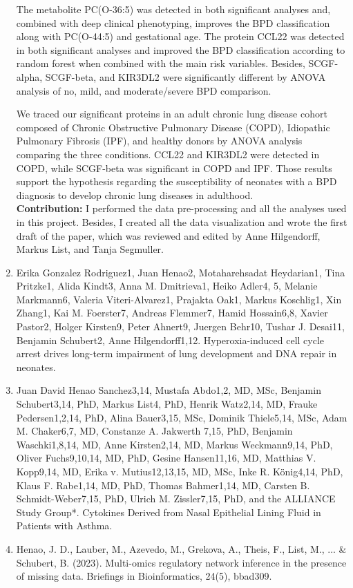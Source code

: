 \begin{enumerate}
The metabolite PC(O-36:5) was detected in both significant analyses and, combined with deep clinical phenotyping, improves the BPD classification along with PC(O-44:5) and gestational age. The protein CCL22 was detected in both significant analyses and improved the BPD classification according to random forest when combined with the main risk variables. Besides, SCGF-alpha, SCGF-beta, and KIR3DL2 were significantly different by ANOVA analysis of no, mild, and moderate/severe BPD comparison.

We traced our significant proteins in an adult chronic lung disease cohort composed of Chronic Obstructive Pulmonary Disease (COPD), Idiopathic Pulmonary Fibrosis (IPF), and healthy donors by ANOVA analysis comparing the three conditions. CCL22 and KIR3DL2 were detected in COPD, while SCGF-beta was significant in COPD and IPF. Those results support the hypothesis regarding the susceptibility of neonates with a BPD diagnosis to develop chronic lung diseases in adulthood.\\

	\textbf{Contribution:} I performed the data pre-processing and all the analyses used in this project. Besides, I created all the data visualization and wrote the first draft of the paper, which was reviewed and edited by Anne Hilgendorff, Markus List, and Tanja Segmuller.
	
	\item Erika Gonzalez Rodriguez1, Juan Henao2, Motaharehsadat Heydarian1, Tina Pritzke1, Alida Kindt3, Anna M. Dmitrieva1, Heiko Adler4, 5, Melanie Markmann6, Valeria Viteri-Alvarez1, Prajakta Oak1, Markus Koschlig1, Xin Zhang1, Kai M. Foerster7, Andreas Flemmer7, Hamid Hossain6,8, Xavier Pastor2, Holger Kirsten9, Peter Ahnert9, Juergen Behr10, Tushar J. Desai11, Benjamin Schubert2, Anne Hilgendorff1,12. Hyperoxia-induced cell cycle arrest drives long-term impairment of lung development and DNA repair in neonates.
	
	\item 	Juan David Henao Sanchez3,14, Mustafa Abdo1,2, MD, MSc, Benjamin Schubert3,14, PhD, Markus List4, PhD, Henrik Watz2,14, MD, Frauke Pedersen1,2,14, PhD, Alina Bauer3,15, MSc, Dominik Thiele5,14, MSc, Adam M. Chaker6,7, MD, Constanze A. Jakwerth 7,15, PhD, Benjamin Waschki1,8,14, MD, Anne Kirsten2,14, MD, Markus Weckmann9,14, PhD, Oliver Fuchs9,10,14, MD, PhD, Gesine Hansen11,16, MD, Matthias V. Kopp9,14, MD, Erika v. Mutius12,13,15, MD, MSc, Inke R. König4,14, PhD, Klaus F.  Rabe1,14, MD, PhD, Thomas Bahmer1,14, MD, Carsten B. Schmidt-Weber7,15, PhD, Ulrich M. Zissler7,15, PhD, and the ALLIANCE Study Group*. Cytokines Derived from Nasal Epithelial Lining Fluid in Patients with Asthma.
	
	\item Henao, J. D., Lauber, M., Azevedo, M., Grekova, A., Theis, F., List, M., ... \& Schubert, B. (2023). Multi-omics regulatory network inference in the presence of missing data. Briefings in Bioinformatics, 24(5), bbad309. 
\end{enumerate}